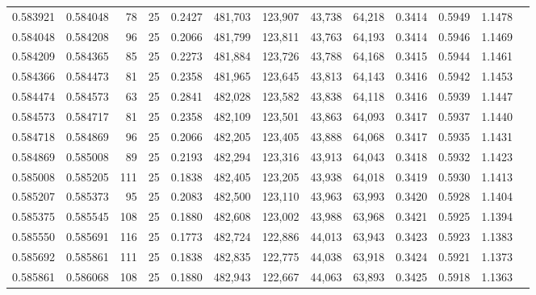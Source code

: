 \begin{tabular}{rrrrrrrrrrrrr}
0.583921 & 0.584048 &    78 &  25 &                                     0.2427 & 481,703 & 123,907 &  43,738 &  64,218 & 0.3414 & 0.5949 & 1.1478 \\
0.584048 & 0.584208 &    96 &  25 &                                     0.2066 & 481,799 & 123,811 &  43,763 &  64,193 & 0.3414 & 0.5946 & 1.1469 \\
0.584209 & 0.584365 &    85 &  25 &                                     0.2273 & 481,884 & 123,726 &  43,788 &  64,168 & 0.3415 & 0.5944 & 1.1461 \\
0.584366 & 0.584473 &    81 &  25 &                                     0.2358 & 481,965 & 123,645 &  43,813 &  64,143 & 0.3416 & 0.5942 & 1.1453 \\
0.584474 & 0.584573 &    63 &  25 &                                     0.2841 & 482,028 & 123,582 &  43,838 &  64,118 & 0.3416 & 0.5939 & 1.1447 \\
0.584573 & 0.584717 &    81 &  25 &                                     0.2358 & 482,109 & 123,501 &  43,863 &  64,093 & 0.3417 & 0.5937 & 1.1440 \\
0.584718 & 0.584869 &    96 &  25 &                                     0.2066 & 482,205 & 123,405 &  43,888 &  64,068 & 0.3417 & 0.5935 & 1.1431 \\
0.584869 & 0.585008 &    89 &  25 &                                     0.2193 & 482,294 & 123,316 &  43,913 &  64,043 & 0.3418 & 0.5932 & 1.1423 \\
0.585008 & 0.585205 &   111 &  25 &                                     0.1838 & 482,405 & 123,205 &  43,938 &  64,018 & 0.3419 & 0.5930 & 1.1413 \\
0.585207 & 0.585373 &    95 &  25 &                                     0.2083 & 482,500 & 123,110 &  43,963 &  63,993 & 0.3420 & 0.5928 & 1.1404 \\
0.585375 & 0.585545 &   108 &  25 &                                     0.1880 & 482,608 & 123,002 &  43,988 &  63,968 & 0.3421 & 0.5925 & 1.1394 \\
0.585550 & 0.585691 &   116 &  25 &                                     0.1773 & 482,724 & 122,886 &  44,013 &  63,943 & 0.3423 & 0.5923 & 1.1383 \\
0.585692 & 0.585861 &   111 &  25 &                                     0.1838 & 482,835 & 122,775 &  44,038 &  63,918 & 0.3424 & 0.5921 & 1.1373 \\
0.585861 & 0.586068 &   108 &  25 &                                     0.1880 & 482,943 & 122,667 &  44,063 &  63,893 & 0.3425 & 0.5918 & 1.1363 \\

\end{tabular}

